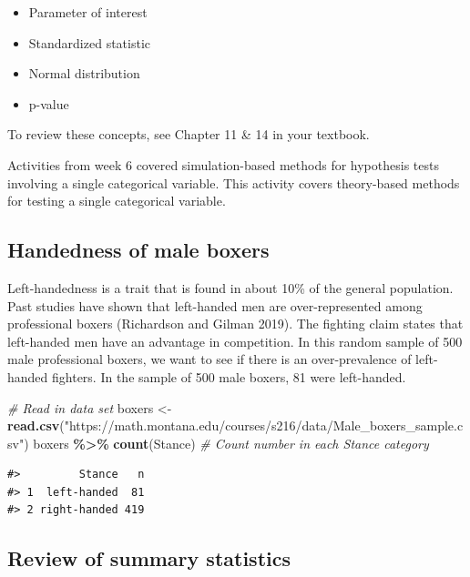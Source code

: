 \documentclass[
]{report}
\newenvironment{Shaded}{\begin{snugshade}}{\end{snugshade}}
\newcommand{\CommentTok}[1]{\textcolor[rgb]{0.56,0.35,0.01}{\textit{#1}}}
\newcommand{\FunctionTok}[1]{\textcolor[rgb]{0.13,0.29,0.53}{\textbf{#1}}}
\newcommand{\NormalTok}[1]{#1}
\newcommand{\OtherTok}[1]{\textcolor[rgb]{0.56,0.35,0.01}{#1}}
\newcommand{\SpecialCharTok}[1]{\textcolor[rgb]{0.81,0.36,0.00}{\textbf{#1}}}
\newcommand{\StringTok}[1]{\textcolor[rgb]{0.31,0.60,0.02}{#1}}
\begin{document}
\begin{itemize}
\item
  Parameter of interest
\item
  Standardized statistic
\item
  Normal distribution
\item
  p-value
\end{itemize}

To review these concepts, see Chapter 11 \& 14 in your textbook.

Activities from week 6 covered simulation-based methods for hypothesis tests involving a single categorical variable. This activity covers theory-based methods for testing a single categorical variable.

\hypertarget{handedness-of-male-boxers}{%
\subsection{Handedness of male boxers}\label{handedness-of-male-boxers}}

Left-handedness is a trait that is found in about 10\% of the general population. Past studies have shown that left-handed men are over-represented among professional boxers (Richardson and Gilman 2019). The fighting claim states that left-handed men have an advantage in competition. In this random sample of 500 male professional boxers, we want to see if there is an over-prevalence of left-handed fighters. In the sample of 500 male boxers, 81 were left-handed.

\begin{Shaded}
\begin{Highlighting}[]
 \CommentTok{\# Read in data set}
\NormalTok{boxers }\OtherTok{\textless{}{-}} \FunctionTok{read.csv}\NormalTok{(}\StringTok{"https://math.montana.edu/courses/s216/data/Male\_boxers\_sample.csv"}\NormalTok{)}
\NormalTok{boxers }\SpecialCharTok{\%\textgreater{}\%} \FunctionTok{count}\NormalTok{(Stance)  }\CommentTok{\# Count number in each Stance category}
\end{Highlighting}
\end{Shaded}

\begin{verbatim}
#>         Stance   n
#> 1  left-handed  81
#> 2 right-handed 419
\end{verbatim}

\hypertarget{review-of-summary-statistics}{%
\subsection*{Review of summary statistics}\label{review-of-summary-statistics}}
\end{document}
